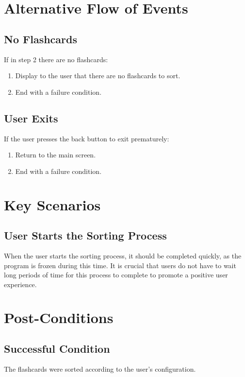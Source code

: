 \documentclass{scrreprt}
\begin{document}
\section{Alternative Flow of Events}

    \subsection{No Flashcards}
    If in step 2 there are no flashcards:
    \begin{enumerate}
        \item Display to the user that there are no flashcards to sort.
        \item End with a failure condition.
    \end{enumerate}
    
    \subsection{User Exits}
    If the user presses the back button to exit prematurely:
    \begin{enumerate}[1.]
        \item Return to the main screen.
        \item End with a failure condition.
    \end{enumerate}

\section{Key Scenarios}
    \subsection{User Starts the Sorting Process}
    When the user starts the sorting process, it should be completed quickly,
    as the program is frozen during this time.
    It is crucial that users do not have to wait long periods of time for this
    process to complete to promote a positive user experience.

\section{Post-Conditions}
    \subsection{Successful Condition}
    The flashcards were sorted according to the user's configuration.
    
\end{document}
